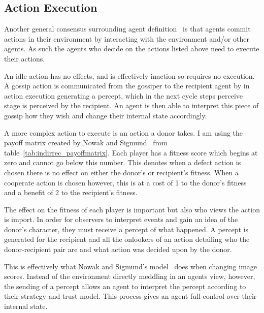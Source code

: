 \documentclass[]{final_report}
\begin{document}
\subsection{Action Execution}
\label{subs:execution}
Another general consensus surrounding agent definition~\cite{franklin1996agent} is that agents commit actions in their environment by interacting with the environment and/or other agents. As such the agents who decide on the actions listed above need to execute their actions.\par
An idle action has no effects, and is effectively inaction so requires no execution. A gossip action is communicated from the gossiper to the recipient agent by in action execution generating a percept, which in the next cycle steps perceive stage is perceived by the recipient. An agent is then able to interpret this piece of gossip how they wish and change their internal state accordingly.\par
A more complex action to execute is an action a donor takes. I am using the payoff matrix created by Nowak and Sigmund~\cite{evol_indirect_image} from table~\ref{tab:indirrec_payoffmatrix}. Each player has a fitness score which begins at zero and cannot go below this number. This denotes when a defect action is chosen there is no effect on either the donor's or recipient's fitness. When a cooperate action is chosen however, this is at a cost of 1 to the donor's fitness and a benefit of 2 to the recipient's fitness.\par
The effect on the fitness of each player is important but also who views the action is import. In order for observers to interpret events and gain an idea of the donor's character, they must receive a percept of what happened. A percept is generated for the recipient and all the onlookers of an action detailing who the donor-recipient pair are and what action was decided upon by the donor.\par
This is effectively what Nowak and Sigmund's model~\cite{evol_indirect_image} does when changing image scores. Instead of the environment directly meddling in an agents view, however, the sending of a percept allows an agent to interpret the percept according to their strategy and trust model. This process gives an agent full control over their internal state.
\end{document}
